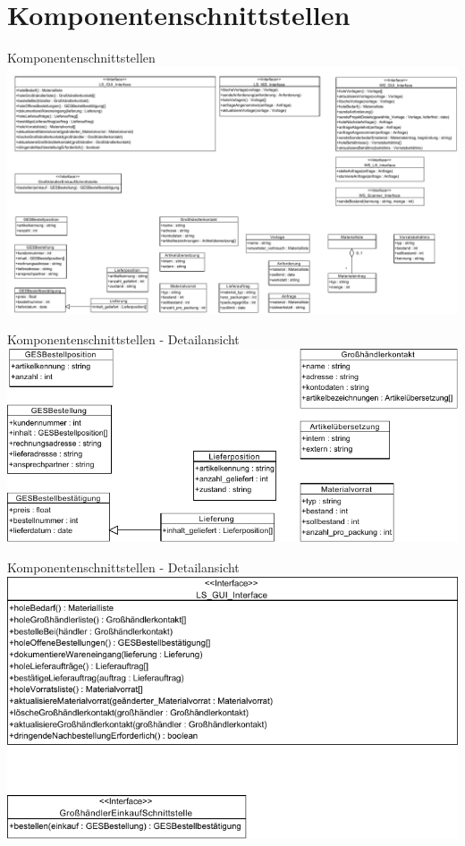 \documentclass{beamer}
\begin{document}
	\section{Komponentenschnittstellen}
	\begin{frame}{Komponentenschnittstellen}
		\includegraphics[width=\textwidth]{PDF/Schnittstellen.pdf}
	\end{frame}
\begin{frame}{Komponentenschnittstellen - Detailansicht}
\includegraphics[width=\textwidth]{PDF/Schnittstellen_links_unten.pdf}
\end{frame}
\begin{frame}{Komponentenschnittstellen - Detailansicht}
\includegraphics[height=0.75\textheight]{PDF/Schnittstellen_links_oben.pdf}
\end{frame}
\end{document}

